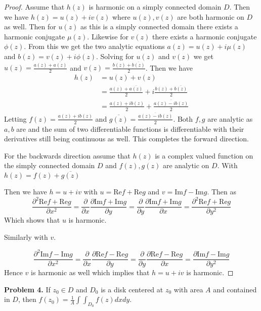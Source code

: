 \documentclass[letter,12pt,reqno]{article}
\begin{document}
\begin{proof}

    Assume that $h(z)$ is harmonic on a simply connected domain $D$. Then we have $h(z)=u(z)+iv(z)$ where $u(z),v(z)$ are both harmonic on $D$ as well. Then for $u(z)$ as this is a simply connected domain there exists a harmonic conjugate $\mu (z)$. Likewise for $v(z)$ there exists a harmonic conjugate $\phi(z)$. From this we get the two analytic equations $a(z)=u(z)+i\mu(z)$ and $b(z)=v(z)+i\phi(z)$. Solving for $u(z)$ and $v(z)$ we get $u(z)=\frac{a(z)+\overline{a(z)}}{2}$ and $v(z)=\frac{b(z)+\overline{b(z)}}{2}$. Then we have \begin{align*}
        h(z)&=u(z)+v(z)\\&=\frac{a(z)+\overline{a(z)}}{2}+i\frac{b(z)+\overline{b(z)}}{2}\\
        &=\frac{a(z)+ib(z)}{2}+\frac{\overline{ a(z)-ib (z)}}{2}
    \end{align*}
    Letting $f(z)=\frac{a(z)+ib(z)}{2}$ and $\overline{g(z)}=\frac{\overline{ a(z)-ib (z)}}{2}$. Both $f,g$ are analytic as $a,b$ are and the sum of two differentiable functions is differentiable with their derivatives still being continuous as well. This completes the forward direction.

    For the backwards direction assume that $h(z)$ is a complex valued function on the simply connected domain $D$ and $f(z),g(z)$ are analytic on $D$. With $h(z)=f(z)+\overline{g(z)}$

    Then we have $h=u+ iv$ with $u=\text{Re} f+\text{Re}g$ and $v=\text{Im}f-\text{Im}g$. Then as \[\frac{\partial^2  \text{Re} f+\text{Re}g}{\partial x^2}=\frac{\partial }{\partial x}\frac{\partial \text{Im}f +\text{Im}g}{\partial y}=\frac{\partial }{\partial y}\frac{\partial \text{Im}f +\text{Im}g}{\partial x}=\frac{\partial ^2 \text{Re}f+\text{Re}g}{\partial y^2}\]
    Which shows that $u$ is harmonic.

    Similarly with $v$.
    
    \[
        \frac{\partial ^2 \text{Im}f - \text{Im}g}{\partial x^2}=\frac{\partial}{\partial x} \frac{\partial \text{Re}f-\text{Re}g}{\partial y}=\frac{\partial}{\partial y} \frac{\partial \text{Re}f-\text{Re}g}{\partial x}=\frac{\partial \text{Im}f -\text{Im} g}{\partial y^2}
    \]
    Hence $v$ is harmonic as well which implies that $h=u+iv$  is harmonic. 


\end{proof}

\begin{tcolorbox}
    \textbf{Problem 4.} If $z_0\in D$ and $D_0$ is a disk centered at $z_0$ with area $A$ and contained in $D$, then $f(z_0)=\frac{1}{A}\int \int_{D_0}f(z)dxdy.$
\end{tcolorbox}
\end{document}
